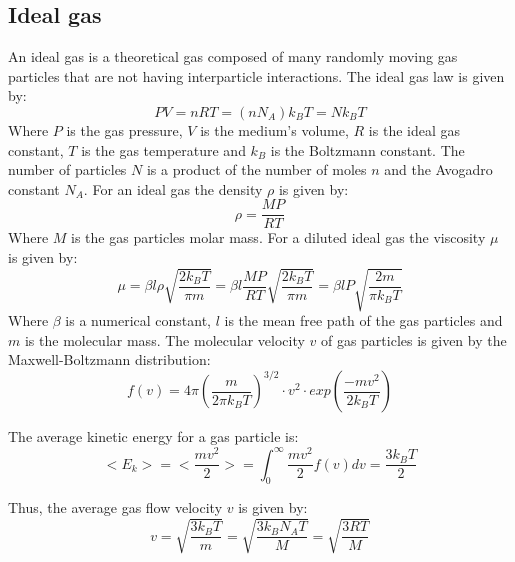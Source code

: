 \documentclass[\main/master.tex]{subfiles}
\begin{document}
\subsection{Ideal gas}
An ideal gas is a theoretical gas composed of many randomly moving gas particles that are not having interparticle interactions. The ideal gas law is given by:
\begin{equation}
PV = nRT = (n N_A) k_B T = N k_B T  \label{eqn:ideal-gasses}
\end{equation}
Where $P$ is the gas pressure, $V$ is the medium's volume, $R$ is the ideal gas constant, $T$ is the gas temperature and $k_B$ is the Boltzmann constant. The number of particles $N$ is a product of the number of moles $n$ and the Avogadro constant $N_A$. For an ideal gas the density $\rho$ is given by:
\begin{equation}
\rho = \frac{MP}{RT}     \label{eqn:ideal density}
\end{equation}
Where $M$ is the gas particles molar mass. For a diluted ideal gas the viscosity $\mu$ is given by:
\begin{equation}
\mu = \beta l \rho \sqrt{\frac{2 k_B  T}{\pi m}}  =  \beta l \frac{MP}{RT} \sqrt{\frac{2 k_B  T}{\pi m}} =  \beta l P \sqrt{\frac{2 m  }{\pi k_B T}}     \label{eqn:viscosity}
\end{equation}
Where $\beta$ is a numerical constant, $l$ is the mean free path of the gas particles and $m$ is the molecular mass. The molecular velocity $v$ of gas particles is given by the Maxwell-Boltzmann distribution:
\begin{equation}
f(v) = 4\pi(\frac{m}{2 \pi k_B T})^{3/2}\cdot v^2\cdot exp(\frac{-mv^2}{2k_BT})     \label{eqn:Maxwell_Boltzmann}
\end{equation} 
\par\noindent 
The average kinetic energy for a gas particle is: 
\begin{equation}
<E_k>=<\frac{mv^2}{2}> = \int_{0}^{\infty}\frac{mv^2}{2}f(v)dv =  \frac{3k_BT}{2}    \label{eqn:average kinetic}
\end{equation}
\par\noindent
Thus, the average gas flow velocity $v$ is given by:
\begin{equation}
v =\sqrt{\frac{3k_B T}{m}}=\sqrt{\frac{3 k_B N_A T}{M}} =  \sqrt{\frac{3RT}{M}}   
\label{eqn:flow velocity}
\end{equation}
\end{document}
